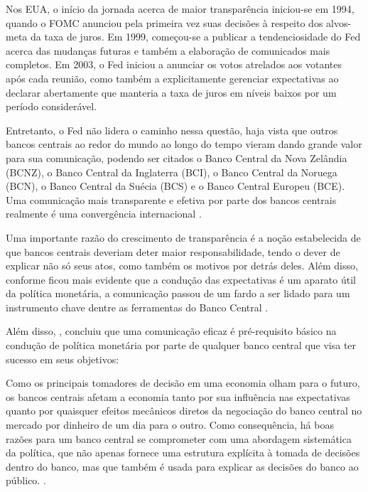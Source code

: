 Nos EUA, o início da jornada acerca de maior transparência iniciou-se em 1994, quando o FOMC anunciou pela primeira vez suas decisões à respeito dos alvos-meta da taxa de juros. Em 1999, começou-se a publicar a tendenciosidade do Fed acerca das mudanças futuras e também a elaboração de comunicados mais completos. Em 2003, o Fed iniciou a anunciar os votos atrelados aos votantes após cada reunião, como também a explicitamente gerenciar expectativas ao declarar abertamente que manteria a taxa de juros em níveis baixos por um período considerável. 

Entretanto, o Fed não lidera o caminho nessa questão, haja vista que outros bancos centrais ao redor do mundo ao longo do tempo vieram dando grande valor para sua comunicação, podendo ser citados o Banco Central da Nova Zelândia (BCNZ), o Banco Central da Inglaterra (BCI), o Banco Central da Noruega (BCN), o Banco Central da Suécia (BCS) e o Banco Central Europeu (BCE). Uma comunicação mais transparente e efetiva por parte dos bancos centrais realmente é uma convergência internacional \cite{blinder2008central}.

Uma importante razão do crescimento de transparência é a noção estabelecida de que bancos centrais deveriam deter maior responsabilidade, tendo o dever de explicar não só seus atos, como também os motivos por detrás deles. Além disso, conforme ficou mais evidente que a condução das expectativas é um aparato útil da política monetária, a comunicação passou de um fardo a ser lidado para um instrumento chave dentre as ferramentas do Banco Central \cite{blinder2008central}.

Além disso, , concluiu que uma comunicação eficaz é pré-requisito básico na condução de política monetária por parte de qualquer banco central que visa ter sucesso em seus objetivos:

\begin{citacao}

Como os principais tomadores de decisão em uma economia olham para o futuro, os bancos centrais afetam a economia tanto por sua influência nas expectativas quanto por quaisquer efeitos mecânicos diretos da negociação do banco central no mercado por dinheiro de um dia para o outro. Como consequência, há boas razões para um banco central se comprometer com uma abordagem sistemática da política, que não apenas fornece uma estrutura explícita à tomada de decisões dentro do banco, mas que também é usada para explicar as decisões do banco ao público. \cite{woodford2005central}.

\end{citacao}

